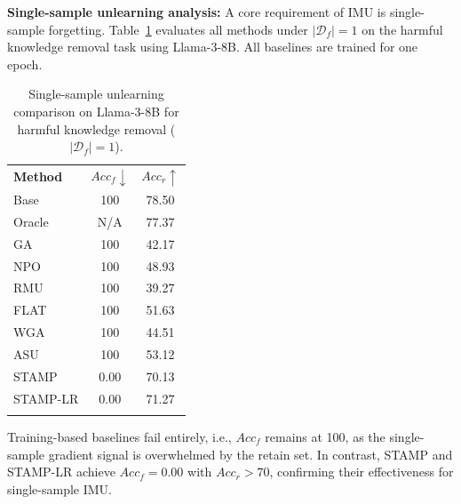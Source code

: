 \noindent
\textbf{Single-sample unlearning analysis:}
A core requirement of IMU is single-sample forgetting. Table~\ref{tab:single_sample} evaluates all methods under $|\mathcal{D}_f| = 1$ on the harmful knowledge removal task using Llama-3-8B. All baselines are trained for one epoch.

\begin{table}[h!]
\centering
\caption{Single-sample unlearning comparison on Llama-3-8B for harmful knowledge removal ($|\mathcal{D}_f| = 1$).}
\small
\label{tab:single_sample}
\renewcommand{\arraystretch}{1.3}
\begin{tabular}{l|cc}
\Xhline{1.15pt}
\textbf{Method} & $Acc_f\!\downarrow$ & $Acc_r\!\uparrow$ \\
\Xhline{1.15pt}
Base                          & 100 & 78.50 \\
\rowcolor{gray!15}
Oracle                        & N/A & 77.37 \\
\midrule
GA~\cite{yao2024large}        & 100 & 42.17 \\
\rowcolor{gray!15}
NPO~\cite{zhang2024negative}  & 100 & 48.93 \\
RMU~\cite{li2024wmdp}         & 100 & 39.27 \\
\rowcolor{gray!15}
FLAT~\cite{wang2024llm}       & 100 & 51.63 \\
WGA~\cite{wang2025rethinking} & 100 & 44.51 \\
\rowcolor{gray!15}
ASU~\cite{zade2026attention}  & 100 & 53.12 \\
\midrule\midrule
STAMP                         & 0.00 & 70.13 \\
STAMP-LR                      & 0.00 & 71.27 \\
\Xhline{1.15pt}
\end{tabular}
\end{table}

Training-based baselines fail entirely, i.e., $Acc_f$ remains at 100, as the single-sample gradient signal is overwhelmed by the retain set. In contrast, STAMP and STAMP-LR achieve $Acc_f = 0.00$ with $Acc_r > 70$, confirming their effectiveness for single-sample IMU.




